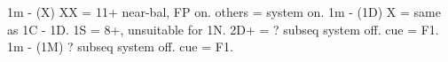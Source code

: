 1m - (X)
    XX = 11+ near-bal, FP on. others = system on.
1m - (1D)
    X = same as 1C - 1D. 1S = 8+, unsuitable for 1N. 2D+ = ? 
    subseq system off. cue = F1.
1m - (1M)
    ?
    subseq system off. cue = F1.
